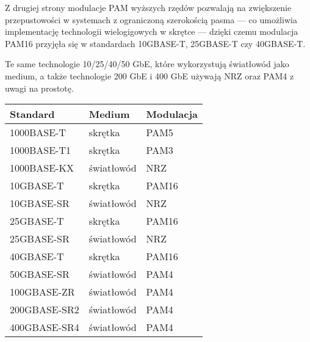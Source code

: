 Z drugiej strony modulacje PAM wyższych rzędów pozwalają na zwiększenie przepustowości w systemach z ograniczoną szerokością pasma --- co
umożliwia implementację technologii wielogigowych w skrętce --- dzięki czemu modulacja PAM16 przyjęła się w standardach 10GBASE-T, 25GBASE-T czy 40GBASE-T.

Te same technologie 10/25/40/50 GbE, które wykorzystują światłowód jako medium, a także technologie 200 GbE i 400 GbE używają NRZ oraz PAM4 z uwagi na prostotę.

\begingroup
{}
\begin{table}[h]
\centering
    \begin{tabular}{m{3cm} m{3cm} m{3cm}}
    \toprule
    Standard & Medium & Modulacja \\
    \midrule
    1000BASE-T & skrętka & PAM5 \\
    \midrule
    1000BASE-T1 & skrętka & PAM3 \\
    \midrule
    1000BASE-KX & światłowód & NRZ \\
    \midrule
    10GBASE-T & skrętka & PAM16 \\
    \midrule
    10GBASE-SR & światłowód & NRZ \\
    \midrule
    25GBASE-T & skrętka & PAM16 \\
    \midrule
    25GBASE-SR & światłowód & NRZ \\
    \midrule
    40GBASE-T & skrętka & PAM16 \\
    \midrule
    50GBASE-SR & światłowód & PAM4 \\
    \midrule
    100GBASE-ZR & światłowód & PAM4 \\
    \midrule
    200GBASE-SR2 & światłowód & PAM4 \\
    \midrule
    400GBASE-SR4 & światłowód & PAM4 \\
    \bottomrule
    \end{tabular}
\end{table}
\endgroup
